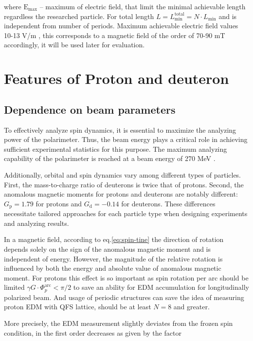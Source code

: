\documentclass[submitting]{nst}
\begin{document}
\noindent where $\mathrm{E}_{\text{max}}$ -- maximum of electric field, that limit the minimal achievable length regardless the researched particle. For total length $L=L_{\text{min}}^{\text{total}} = N\cdot L_{\text{min}}$ and is independent from number of periods. Maximum achievable electric field values 10-13 V/m \cite{wien}, this corresponds to a magnetic field of the order of 70-90 mT accordingly, it will be used later for evaluation.

\section{Features of Proton and deuteron}\label{sec.III}

\subsection{Dependence on beam parameters}

\par To effectively analyze spin dynamics, it is essential to maximize the analyzing power of the polarimeter. Thus, the beam energy plays a critical role in achieving sufficient experimental statistics for this purpose. The maximum analyzing capability of the polarimeter is reached at a beam energy of 270 MeV \cite{Pol}. 

\par Additionally, orbital and spin dynamics vary among different types of particles. First, the mass-to-charge ratio of deuterons is twice that of protons. Second, the anomalous magnetic moments for protons and deuterons are notably different: $G_{\text{p}} = 1.79$  for protons and $G_{\text{d}} = -0.14$ for deuterons. These differences necessitate tailored approaches for each particle type when designing experiments and analyzing results.

\par In a magnetic field, according to eq.\ref{eq:spin-tine} the direction of rotation depends solely on the sign of the anomalous magnetic moment and is independent of energy. However, the magnitude of the relative rotation is influenced by both the energy and absolute value of anomalous magnetic moment. For protons this effect is so important as spin rotation per arc should be limited $\gamma G \cdot \Phi_{p}^{\text{arc}} < \pi/2$ to save an ability for EDM accumulation for longitudinally polarized beam. And usage of periodic structures can save the idea of measuring proton EDM with QFS lattice, should be at least $N=8$ and greater. 
\par More precisely, the EDM measurement slightly deviates from the frozen spin condition, in the first order decreases as given by the factor \cite{consider}
\end{document}
